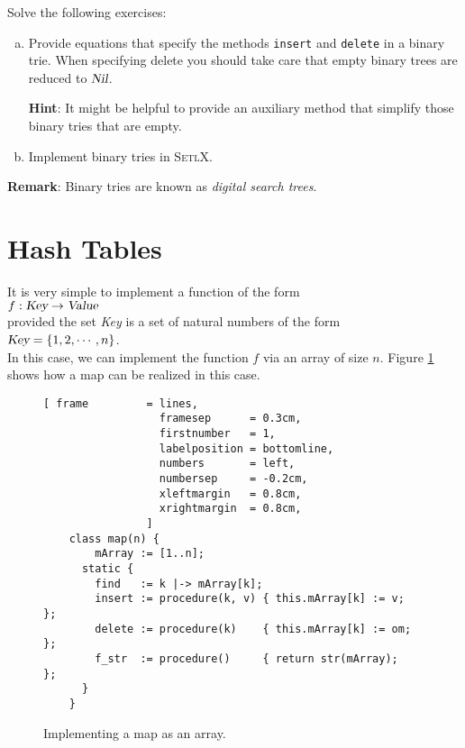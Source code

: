 Solve the following exercises:
\begin{enumerate}[(a)]
\item Provide equations that specify the methods \texttt{insert} and \texttt{delete} in a binary trie.
      When specifying delete you should take care that empty binary trees are reduced to
      $\textsl{Nil}$.

      \textbf{Hint}:  It might be helpful to provide an auxiliary method that simplify those binary
      tries that are empty.
\item Implement binary tries in \textsc{SetlX}.
\end{enumerate}
\textbf{Remark}: Binary tries are known as \emph{digital search trees}.  \eox

\section{Hash Tables}
It is very simple to implement a function of the form \\[0.2cm]
\hspace*{1.3cm} $f: \textsl{Key} \rightarrow \textsl{Value}$ \\[0.2cm]
provided the set \textsl{Key} is a set of natural numbers of the form  \\[0.2cm]
\hspace*{1.3cm} $\textsl{Key} = \{ 1, 2, \cdots, n \}$. \\[0.2cm]
In this case, we can implement the function $f$ via an array of size $n$.
Figure \ref{fig:map-array.stlx} shows how a map can be realized in this case.

\begin{figure}[!ht]
\centering
\begin{Verbatim}[ frame         = lines, 
                  framesep      = 0.3cm, 
                  firstnumber   = 1,
                  labelposition = bottomline,
                  numbers       = left,
                  numbersep     = -0.2cm,
                  xleftmargin   = 0.8cm,
                  xrightmargin  = 0.8cm,
                ]
    class map(n) {
        mArray := [1..n];
      static {
        find   := k |-> mArray[k];
        insert := procedure(k, v) { this.mArray[k] := v;  };
        delete := procedure(k)    { this.mArray[k] := om; };
        f_str  := procedure()     { return str(mArray);   };
      }
    }
\end{Verbatim}
\vspace*{-0.3cm}
\caption{Implementing a map as an array.}
\label{fig:map-array.stlx}
\end{figure}




